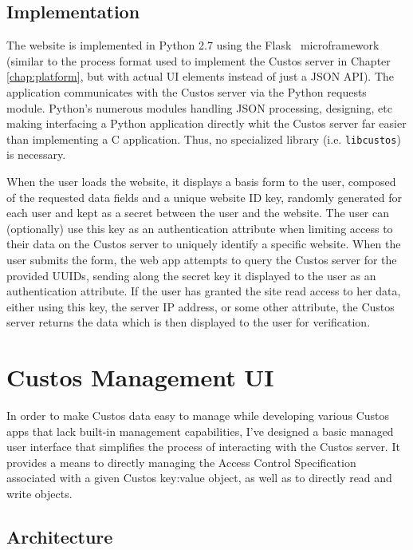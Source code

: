 \subsection{Implementation}

The website is implemented in Python 2.7 using the
Flask~\cite{python-flask} microframework (similar to the process
format used to implement the Custos server in Chapter
\ref{chap:platform}, but with actual UI elements instead of just a
JSON API). The application communicates with the Custos server via the
Python requests~\cite{python-requests} module. Python's numerous
modules handling JSON processing, designing, etc making interfacing a
Python application directly whit the Custos server far easier than
implementing a C application. Thus, no specialized library
(i.e. \texttt{libcustos}) is necessary.

When the user loads the website, it displays a basis form to the user,
composed of the requested data fields and a unique website ID key,
randomly generated for each user and kept as a secret between the user
and the website. The user can (optionally) use this key as an
authentication attribute when limiting access to their data on the
Custos server to uniquely identify a specific website. When the user
submits the form, the web app attempts to query the Custos server for
the provided UUIDs, sending along the secret key it displayed to the
user as an authentication attribute. If the user has granted the site
read access to her data, either using this key, the server IP address,
or some other attribute, the Custos server returns the data which is
then displayed to the user for verification.



\section{Custos Management UI}

In order to make Custos data easy to manage while developing various
Custos apps that lack built-in management capabilities, I've designed
a basic managed user interface that simplifies the process of
interacting with the Custos server. It provides a means to directly
managing the Access Control Specification associated with a given
Custos key:value object, as well as to directly read and write
objects.

\subsection{Architecture}

